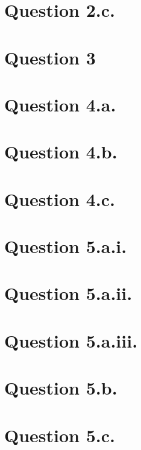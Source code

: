 \documentclass{article}
\begin{document}
\section*{Question 2.c.}
\section*{Question 3}
\section*{Question 4.a.}
\section*{Question 4.b.}
\section*{Question 4.c.}
\section*{Question 5.a.i.}
\section*{Question 5.a.ii.}
\section*{Question 5.a.iii.}
\section*{Question 5.b.}
\section*{Question 5.c.}
\end{document}
